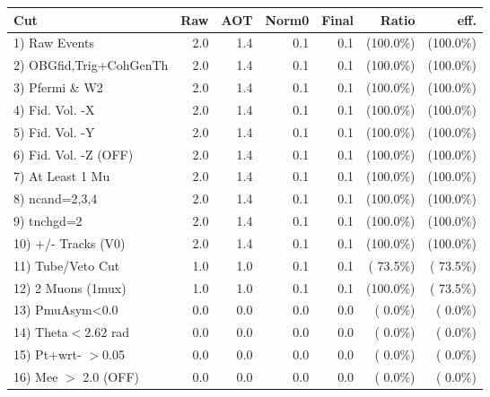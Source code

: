  \begin{table}[h!]\centering
 \begin{tabular}{||l||r|r|r|r|r|r||}
 \hline
 \hline
 Cut & Raw & AOT & Norm0 & Final & Ratio & eff.       \\
 \hline
  1) Raw Events           &          2.0 &          1.4 &          0.1 &          0.1 & (100.0\%) & (100.0\%) \\
  2) OBGfid,Trig+CohGenTh &          2.0 &          1.4 &          0.1 &          0.1 & (100.0\%) & (100.0\%) \\
  3) Pfermi \& W2         &          2.0 &          1.4 &          0.1 &          0.1 & (100.0\%) & (100.0\%) \\
  4) Fid. Vol. -X         &          2.0 &          1.4 &          0.1 &          0.1 & (100.0\%) & (100.0\%) \\
  5) Fid. Vol. -Y         &          2.0 &          1.4 &          0.1 &          0.1 & (100.0\%) & (100.0\%) \\
  6) Fid. Vol. -Z (OFF)   &          2.0 &          1.4 &          0.1 &          0.1 & (100.0\%) & (100.0\%) \\
  7) At Least 1 Mu        &          2.0 &          1.4 &          0.1 &          0.1 & (100.0\%) & (100.0\%) \\
  8) ncand=2,3,4          &          2.0 &          1.4 &          0.1 &          0.1 & (100.0\%) & (100.0\%) \\
  9) tnchgd=2             &          2.0 &          1.4 &          0.1 &          0.1 & (100.0\%) & (100.0\%) \\
 10) +/- Tracks (V0)      &          2.0 &          1.4 &          0.1 &          0.1 & (100.0\%) & (100.0\%) \\
 11) Tube/Veto Cut        &          1.0 &          1.0 &          0.1 &          0.1 & ( 73.5\%) & ( 73.5\%) \\
 12) 2 Muons (1mux)       &          1.0 &          1.0 &          0.1 &          0.1 & (100.0\%) & ( 73.5\%) \\
 13) PmuAsym<0.0          &          0.0 &          0.0 &          0.0 &          0.0 & (  0.0\%) & (  0.0\%) \\
 14) Theta$<$2.62 rad     &          0.0 &          0.0 &          0.0 &          0.0 & (  0.0\%) & (  0.0\%) \\
 15) Pt+wrt- $>$0.05      &          0.0 &          0.0 &          0.0 &          0.0 & (  0.0\%) & (  0.0\%) \\
 16) Mee $>$ 2.0  (OFF)   &          0.0 &          0.0 &          0.0 &          0.0 & (  0.0\%) & (  0.0\%) \\

\end{tabular}
\end{table}
